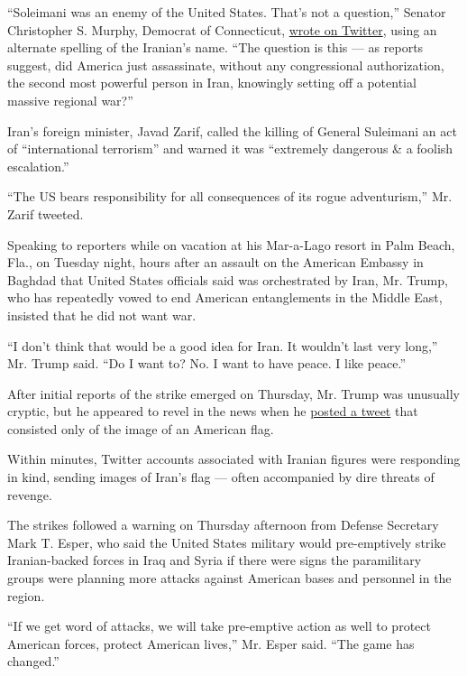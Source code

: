 ``Soleimani was an enemy of the United States. That's not a question,''
Senator Christopher S. Murphy, Democrat of Connecticut,
\href{https://twitter.com/ChrisMurphyCT/status/1212913952436445185?ref_src=twsrc\%5Egoogle\%7Ctwcamp\%5Eserp\%7Ctwgr\%5Etweet}{wrote
on Twitter}, using an alternate spelling of the Iranian's name. ``The
question is this --- as reports suggest, did America just assassinate,
without any congressional authorization, the second most powerful person
in Iran, knowingly setting off a potential massive regional war?''

Iran's foreign minister, Javad Zarif, called the killing of General
Suleimani an act of ``international terrorism'' and warned it was
``extremely dangerous \& a foolish escalation.''

``The US bears responsibility for all consequences of its rogue
adventurism,'' Mr. Zarif tweeted.

Speaking to reporters while on vacation at his Mar-a-Lago resort in Palm
Beach, Fla., on Tuesday night, hours after an assault on the American
Embassy in Baghdad that United States officials said was orchestrated by
Iran, Mr. Trump, who has repeatedly vowed to end American entanglements
in the Middle East, insisted that he did not want war.

``I don't think that would be a good idea for Iran. It wouldn't last
very long,'' Mr. Trump said. ``Do I want to? No. I want to have peace. I
like peace.''

After initial reports of the strike emerged on Thursday, Mr. Trump was
unusually cryptic, but he appeared to revel in the news when he
\href{https://twitter.com/realDonaldTrump/status/1212924762827046918}{posted
a tweet} that consisted only of the image of an American flag.

Within minutes, Twitter accounts associated with Iranian figures were
responding in kind, sending images of Iran's flag --- often accompanied
by dire threats of revenge.

The strikes followed a warning on Thursday afternoon from Defense
Secretary Mark T. Esper, who said the United States military would
pre-emptively strike Iranian-backed forces in Iraq and Syria if there
were signs the paramilitary groups were planning more attacks against
American bases and personnel in the region.

``If we get word of attacks, we will take pre-emptive action as well to
protect American forces, protect American lives,'' Mr. Esper said. ``The
game has changed.''

